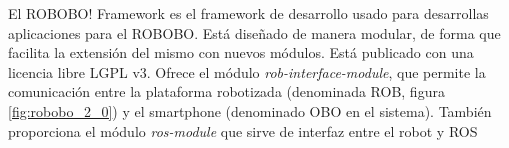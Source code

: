 El ROBOBO! Framework\cite{RoboboFramework} es el framework de desarrollo usado para desarrollas aplicaciones para el ROBOBO. Está diseñado de manera modular, de forma que facilita la extensión del mismo con nuevos módulos. Está publicado con una licencia libre LGPL v3.
Ofrece el módulo \textit{rob-interface-module}, que permite la comunicación entre la plataforma robotizada (denominada ROB, figura \ref{fig:robobo_2_0}) y el smartphone (denominado OBO en el sistema). También proporciona el módulo \textit{ros-module} que sirve de interfaz entre el robot y ROS \cite{Ros}










 